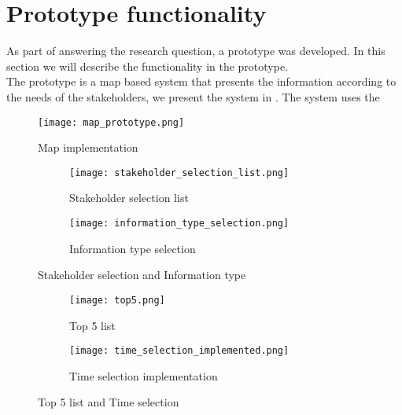 
\section{Prototype functionality} %
\label{sec:prototype_functionality}
As part of answering the research question, a prototype was developed. In this
section we will describe the functionality in the prototype.\\

The prototype is a map based system that presents the information according to
the needs of the stakeholders, we present the system in
. The system uses the 



\begin{figure}[!htbp]
	\texttt{[image: map\_prototype.png]}
	\caption[Map implementation]{Map implementation}
	\label{fig:map_prototype}
\end{figure}

\begin{figure}[h!tbp]
	\centering
	\begin{subfigure}{0.4\textwidth}
		\texttt{[image: stakeholder\_selection\_list.png]}
		\caption[Stakeholder selection list]{Stakeholder selection list}
		\label{fig:stakeholder_selection_list}
	\end{subfigure}
	\begin{subfigure}{0.3\textwidth}
		\texttt{[image: information\_type\_selection.png]}
		\caption[Information type selection]{Information type selection}
		\label{fig:implementation_type_selection}
	\end{subfigure}
	\caption[Stakeholder selection and Information type]{Stakeholder selection and Information type}
	\label{fig:stakeholder_selection_and_information_type}
\end{figure}

\begin{figure}[h!tbp]
	\centering
	\begin{subfigure}{0.4\textwidth}
		\texttt{[image: top5.png]}
		\caption[Top 5 list]{Top 5 list}
		\label{fig:top_5_list}
	\end{subfigure}
	\begin{subfigure}{0.6\textwidth}
		\texttt{[image: time\_selection\_implemented.png]}
		\caption[Time selection implementation]{Time selection implementation}
		\label{fig:time_selection_implemented}
	\end{subfigure}
	\caption[Top 5 list and Time selection]{Top 5 list and Time selection}
	\label{fig:Top5_list_and_time_selection}
\end{figure}

